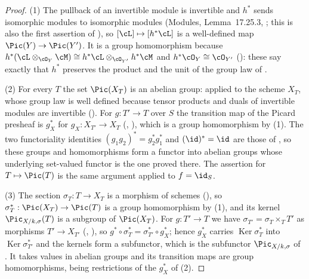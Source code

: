\begin{proof}
(1) The pullback of an invertible module is invertible and $h^*$ sends
isomorphic modules to isomorphic modules (Modules, Lemma~17.25.3,
; this is also the first assertion of
), so $[\cL]\mapsto[h^*\cL]$ is a
well-defined map $\Pic(Y)\to\Pic(Y')$.  It is a group homomorphism
because $h^*(\cL\otimes_{\cO_Y}\cM)\cong
h^*\cL\otimes_{\cO_{Y'}}h^*\cM$ and $h^*\cO_Y\cong\cO_{Y'}$
(): these say exactly
that $h^*$ preserves the product and the unit of the group law of
.

(2) For every $T$ the set $\Pic(X_T)$ is an abelian group:
 applied to the scheme $X_T$, whose group law
is well defined because tensor products and duals of invertible modules
are invertible ().  For $g:T'\to T$
over $S$ the transition map of the Picard presheaf is $g_X^*$ for
$g_X:X_{T'}\to X_T$ (,
), which is a group homomorphism by (1).  The
two functoriality identities $(g_1g_2)^*=g_2^*g_1^*$ and
$(\id)^*=\id$ are those of , so
these groups and homomorphisms form a functor into abelian groups whose
underlying set-valued functor is the one proved there.  The assertion
for $T\mapsto\Pic(T)$ is the same argument applied to $f=\id_S$.

(3) The section $\sigma_T:T\to X_T$ is a morphism of schemes
(), so $\sigma_T^*:\Pic(X_T)\to\Pic(T)$ is
a group homomorphism by (1), and its kernel $\Pic_{X/k,\sigma}(T)$ is a
subgroup of $\Pic(X_T)$.  For $g:T'\to T$ we have
$\sigma_{T'}=\sigma_T\times_TT'$ as morphisms $T'\to X_{T'}$
(, ), so
$g^*\circ\sigma_T^*=\sigma_{T'}^*\circ g_X^*$; hence $g_X^*$ carries
$\operatorname{Ker}\sigma_T^*$ into $\operatorname{Ker}\sigma_{T'}^*$
and the kernels form a subfunctor, which is the subfunctor
$\Pic_{X/k,\sigma}$ of .  It takes values
in abelian groups and its transition maps are group homomorphisms, being
restrictions of the $g_X^*$ of (2).
\end{proof}


